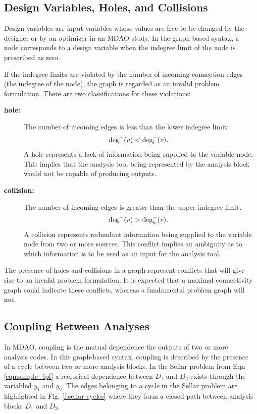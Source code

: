 \subsection{Design Variables, Holes, and Collisions}
Design variables are input variables whose values are free to be 
changed by the designer or by an optimizer in an MDAO study. In the graph-based syntax, a node corresponds to a design variable when the indegree limit of the node is prescribed as zero.

If the indegree limits are violated by the number of incoming connection edges (the indegree of the node), the graph is regarded as an invalid problem formulation. There are two classifications for these violations:
  \begin{description}
    \item[\bf{hole:}] The number of incoming edges is less than the lower indegree limit:
      \begin{equation} 
\textrm{deg}^-(v) < \textrm{deg}_l^-(v). 
\label{e:hole} 
\end{equation}
      A hole represents a lack of information being supplied to the variable node. This implies that the analysis tool being represented by the analysis block would not be capable of producing outputs.
    \item[\bf{collision:}] The number of incoming edges is greater than the upper indegree limit. 
      \begin{equation} 
\textrm{deg}^-(v) > \textrm{deg}_u^-(v). 
\label{e:collision}
\end{equation}A collision represents redundant information being supplied to the variable node from two or more sources. This conflict implies an ambiguity as to which information is to be used as an input for the analysis tool.
  \end{description} 

  The presence of holes and collisions in a graph represent conflicts that will give
  rise to an invalid problem formulation. It is expected that a maximal connectivity graph could indicate these conflicts, whereas a fundamental problem graph will not.

\subsection{Coupling Between Analyses}
  In MDAO, coupling is the mutual dependence the outputs of two or more analysis 
  codes. In this graph-based syntax, coupling is described by the presence of a 
  cycle between two or more analysis blocks. In the Sellar problem from Eqn \ref{eqn:simple_fpf} 
  a reciprical dependence between $D_1$ and $D_2$ exists through the variabled $y_1$ and $y_2$. 
  The edges belonging to a cycle in the Sellar problem are highlighted in 
  Fig. \ref{f:sellar cycles} where they form a closed path between analysis blocks $D_1$ and $D_2$.

